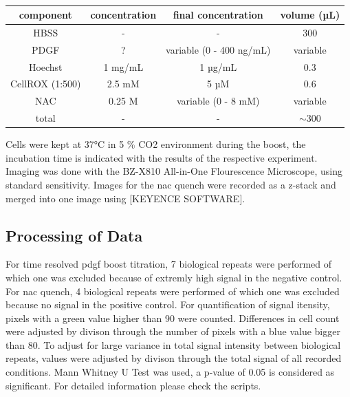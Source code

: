     \begin{table}[h]
    \capstart
    \centering
    \begin{minipage}{\captionwidth}
        \caption[Seahorse Assay]{}
        \label{tab:cellrox_table}
    \end{minipage}
    \begin{tabular}{|c|c|c|c|}
        \hline
        component         & concentration & final concentration      & volume (µL) \\ \hline
        HBSS              & -             & -                        & 300         \\
        PDGF              & ?             & variable (0 - 400 ng/mL) & variable    \\
        Hoechst           & 1 mg/mL       & 1 µg/mL                  & 0.3         \\
        CellROX   (1:500) & 2.5 mM        & 5 µM                     & 0.6         \\
        NAC               & 0.25 M        & variable (0 - 8 mM)      & variable    \\ \hline
        total             & -             & -                        & $\sim$300   \\ \hline
    \end{tabular}
    \end{table}

    Cells were kept at 37°C in 5 \% CO2 environment during the boost, the incubation time is indicated with the results of the respective experiment. Imaging was done with the BZ-X810 All-in-One Flourescence Microscope, using standard sensitivity. Images for the \ac{nac} quench were recorded as a z-stack and merged into one image using [KEYENCE SOFTWARE].

    \subsection{Processing of Data}
    For time resolved \ac{pdgf} boost titration, 7 biological repeats were performed of which one was excluded because of extremly high signal in the negative control. For \ac{nac} quench, 4 biological repeats were performed of which one was excluded because no signal in the positive control.
    For quantification of signal itensity, pixels with a green value higher than 90 were counted. Differences in cell count were adjusted by divison through the number of pixels with a blue value bigger than 80. To adjust for large variance in total signal intensity between biological repeats, values were adjusted by divison through the total signal of all recorded conditions.
    Mann Whitney U Test was used, a p-value of 0.05 is considered as significant. For detailed information please check the scripts.


